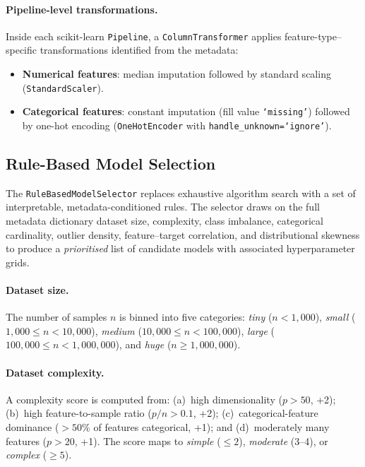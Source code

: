 \documentclass[conference]{llncs}
\begin{document}
   \paragraph{Pipeline-level transformations.}
   Inside each scikit-learn \texttt{Pipeline}, a \texttt{ColumnTransformer} applies feature-type--specific transformations identified from the metadata:
   \begin{itemize}
   \item \textbf{Numerical features}: median imputation followed by standard scaling (\texttt{StandardScaler}).
   \item \textbf{Categorical features}: constant imputation (fill value \texttt{`missing'}) followed by one-hot encoding (\texttt{OneHotEncoder} with \texttt{handle\_unknown=`ignore'}).
   \end{itemize}

   \subsection{Rule-Based Model Selection}
   \label{sec:model_selection}

   The \texttt{RuleBasedModelSelector} replaces exhaustive algorithm search with a set of interpretable, metadata-conditioned rules.  The selector draws on the full metadata dictionary dataset size, complexity, class imbalance, categorical cardinality, outlier density, feature--target correlation, and distributional skewness to produce a \emph{prioritised} list of candidate models with associated hyperparameter grids.

   \paragraph{Dataset size.}
   The number of samples $n$ is binned into five categories: \emph{tiny} ($n < 1{,}000$), \emph{small} ($1{,}000 \leq n < 10{,}000$), \emph{medium} ($10{,}000 \leq n < 100{,}000$), \emph{large} ($100{,}000 \leq n < 1{,}000{,}000$), and \emph{huge} ($n \geq 1{,}000{,}000$).

   \paragraph{Dataset complexity.}
   A complexity score is computed from: (a)~high dimensionality ($p > 50$, +2); (b)~high feature-to-sample ratio ($p/n > 0.1$, +2); (c)~categorical-feature dominance ($>50\%$ of features categorical, +1); and (d)~moderately many features ($p > 20$, +1). The score maps to \emph{simple} ($\leq 2$), \emph{moderate} (3--4), or \emph{complex} ($\geq 5$).
\end{document}
